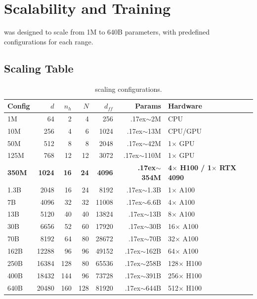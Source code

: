 
\section{Scalability and Training}
\label{sec:scalability}

\aletheion{} was designed to scale from 1M to 640B parameters, with
predefined configurations for each range.

\subsection{Scaling Table}

\begin{table}[H]
\centering
\caption{\aletheion{} scaling configurations.}
\label{tab:scaling}
\begin{tabular}{lrrrrrl}
\toprule
\textbf{Config} & \textbf{$d$} & \textbf{$n_h$} & \textbf{$N$} & \textbf{$d_{ff}$} & \textbf{Params} & \textbf{Hardware} \\
\midrule
1M & 64 & 2 & 4 & 256 & {\raise.17ex\hbox{$\scriptstyle\sim$}}2M & CPU \\
10M & 256 & 4 & 6 & 1024 & {\raise.17ex\hbox{$\scriptstyle\sim$}}13M & CPU/GPU \\
50M & 512 & 8 & 8 & 2048 & {\raise.17ex\hbox{$\scriptstyle\sim$}}42M & 1$\times$ GPU \\
125M & 768 & 12 & 12 & 3072 & {\raise.17ex\hbox{$\scriptstyle\sim$}}110M & 1$\times$ GPU \\
\textbf{350M} & \textbf{1024} & \textbf{16} & \textbf{24} & \textbf{4096} & \textbf{{\raise.17ex\hbox{$\scriptstyle\sim$}}354M} & \textbf{4$\times$ H100 / 1$\times$ RTX 4090} \\
1.3B & 2048 & 16 & 24 & 8192 & {\raise.17ex\hbox{$\scriptstyle\sim$}}1.3B & 1$\times$ A100 \\
7B & 4096 & 32 & 32 & 11008 & {\raise.17ex\hbox{$\scriptstyle\sim$}}6.6B & 4$\times$ A100 \\
13B & 5120 & 40 & 40 & 13824 & {\raise.17ex\hbox{$\scriptstyle\sim$}}13B & 8$\times$ A100 \\
30B & 6656 & 52 & 60 & 17920 & {\raise.17ex\hbox{$\scriptstyle\sim$}}30B & 16$\times$ A100 \\
70B & 8192 & 64 & 80 & 28672 & {\raise.17ex\hbox{$\scriptstyle\sim$}}70B & 32$\times$ A100 \\
162B & 12288 & 96 & 96 & 49152 & {\raise.17ex\hbox{$\scriptstyle\sim$}}162B & 64$\times$ A100 \\
250B & 16384 & 128 & 80 & 65536 & {\raise.17ex\hbox{$\scriptstyle\sim$}}258B & 128$\times$ H100 \\
400B & 18432 & 144 & 96 & 73728 & {\raise.17ex\hbox{$\scriptstyle\sim$}}391B & 256$\times$ H100 \\
640B & 20480 & 160 & 128 & 81920 & {\raise.17ex\hbox{$\scriptstyle\sim$}}644B & 512$\times$ H100 \\
\bottomrule
\end{tabular}
\end{table}

